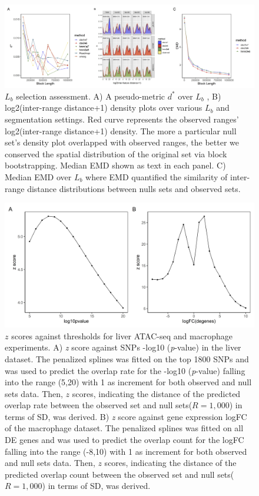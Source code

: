 \documentclass{article}
\begin{document}
\begin{figure}[htbp]
\centering
\includegraphics[scale=0.35]{Figures/sfig1.jpeg}
\caption{$L_b$ selection assessment. A) A pseudo-metric $d^*$
  \citep{bickel2010subsampling} over $L_b$ , B) 
  log2(inter-range distance+1) density plots over various $L_b$ and
  segmentation settings. Red curve represents the observed ranges'
  log2(inter-range distance+1) density.
  The more a particular null set's density
  plot overlapped with observed ranges, the better we conserved the
  spatial distribution of the original set via block
  bootstrapping. Median EMD shown as text in each panel. C) Median
  EMD over $L_b$ where EMD quantified the similarity of inter-range
  distance distributions between nulls sets and observed sets.}
\label{fig:suppfig0}
\end{figure}

\begin{figure}[htbp]
\centering
\includegraphics[scale=0.3]{Figures/zscore.jpeg}
\caption{
  $z$ scores against thresholds for liver ATAC-seq and macrophage experiments.
  A) \textit{z} score against SNPs -log10 (\textit{p}-value)  in the liver
  dataset. The penalized splines was fitted on the top 1800 SNPs and was used to predict the overlap rate for the -log10 (\textit{p}-value) falling into the range (5,20) with 1 as increment for both observed and null sets data. Then, $z$ scores, indicating the distance of the predicted overlap rate between the observed set and
null sets($R = 1,000$) in terms of SD, was derived. B) \textit{z} score against gene expression logFC of the
  macrophage dataset. The penalized splines was fitted on all DE genes and was used to predict the overlap count for the logFC falling into the range (-8,10) with 1 as increment for both observed and null sets data. Then, $z$ scores, indicating the distance of the predicted overlap count between the observed set and
null sets($R = 1,000$) in terms of SD, was derived.}
\label{fig:suppfig2}
\end{figure}
\end{document}
